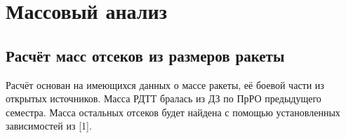 \documentclass[a4paper,12pt]{report}
\begin{document}
\chapter{Массовый анализ}
\section{Расчёт масс отсеков из размеров ракеты}
Расчёт основан на имеющихся данных о массе ракеты, её боевой части из открытых источников. Масса РДТТ бралась из ДЗ по ПрРО предыдущего семестра. Масса остальных отсеков будет найдена
с помощью установленных зависимостей из [1].
\end{document}
